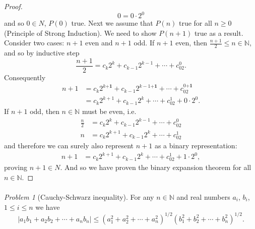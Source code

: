 \documentclass[11pt,twoside, reqno, align]{amsart}
\theoremstyle{remark}
\newtheorem{Prob}{Problem}
\def\N{\mathbb N}
\begin{document}
\begin{proof}
$$
0 = 0 \cdot 2^0
$$
and so $0 \in N$, $P(0)$ true. Next we assume that $P(n)$ true for all $n \geq 0$ (Principle of Strong Induction). We need to show $P(n+1)$ true as a result. Consider two cases: $n+1$ even and $n+1$ odd. If $n+1$ even, then $\frac{n+1}{2} \leq n \in \N$, and so by inductive step
$$
\frac{n+1}{2} = c_k2^k+c_{k-1}2^{k-1}+\cdots+c_02^0.
$$
Consequently 
\begin{align*}
   n+1 & = c_k2^{k\mathbf{+1}}+c_{k-1}2^{k-1\mathbf{+1}}+\cdots+c_02^{0\mathbf{+1}} \\
   & = c_k2^{k+1}+c_{k-1}2^k+\cdots+c_02^1 + 0\cdot2^0.
\end{align*}
If $n+1$ odd, then $n \in \N$ must be even, i.e.
\begin{align*}
    \frac{n}{2} & =c_k2^k+c_{k-1}2^{k-1}+\cdots+c_02^0 \\
    n & = c_k2^{k+1}+c_{k-1}2^k+\cdots+c_02^1
\end{align*}
and therefore we can surely also represent $n+1$ as a binary representation:
\begin{align*}
    n+1 & = c_k2^{k+1}+c_{k-1}2^k+\cdots+c_02^1 + 1\cdot2^0,
\end{align*}
proving $n+1 \in N$. And so we have proven the binary expansion theorem for all $n \in \N$.
\end{proof}

\paragraph{}

\begin{Prob}[Cauchy-Schwarz inequality]
For any $n\in \N$ and real numbers $a_i$, $b_i$, $1\leq i\leq n$ we have 
$$
|a_1b_1+a_2b_2+\cdots+a_nb_n|\leq (a_1^2+a_2^2+\cdots+a_n^2)^{1/2}(b_1^2+b_2^2+\cdots+b_n^2)^{1/2}.
$$
\end{Prob}
\end{document}
